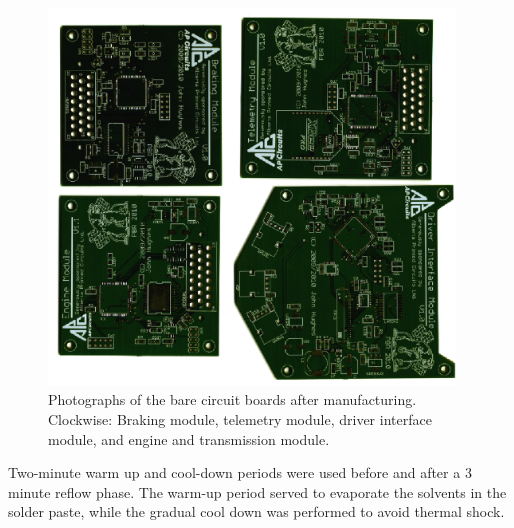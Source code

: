 \begin{figure}[H]
 \centering
 \includegraphics[width=4.25in,keepaspectratio]{implementation/figures/empty_pcbs.eps}
 \caption[Photographs of the bare circuit boards after manufacturing.]{Photographs of the bare circuit boards after manufacturing. Clockwise: Braking module, telemetry module, driver interface module, and engine and transmission module.}
 \label{fig:empty_pcbs}
\end{figure}

Two-minute warm up and cool-down periods were used before and after a 3 minute reflow phase. The warm-up period served to evaporate the solvents in the solder paste, while the gradual cool down was performed to avoid thermal shock.

